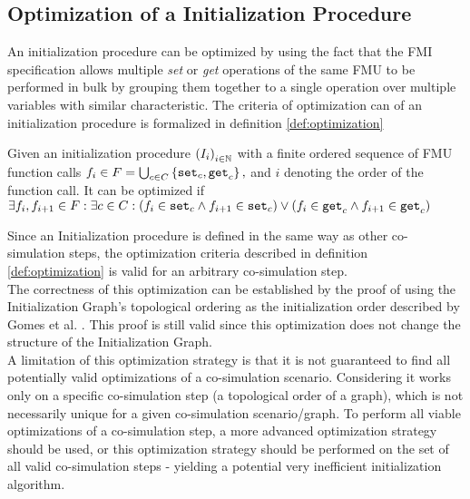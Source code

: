 \subsection{Optimization of a Initialization Procedure}
An initialization procedure can be optimized by using the fact that the FMI specification allows multiple \textit{set} or \textit{get} operations of the same FMU to be performed in bulk by grouping them together to a single operation over multiple variables with similar characteristic. The criteria of optimization can of an initialization procedure is formalized in definition \ref{def:optimization}
\begin{definition}\label{def:optimization}
  Given an initialization procedure $ \left( I_i \right)_{i \in \mathbb{N}}$ with a finite ordered sequence of FMU function calls $f_i \in F = \bigcup_{c \in C}  \left\{ \mathtt{set}_{c},\mathtt{get}_{c} \right\},$ and $i$ denoting the order of the function call. It can be optimized if $\exists f_i, f_{i +1} \in F : \exists c \in C :(f_i \in {\mathtt{set}_{c}} \land f_{i+1} \in {\mathtt{set}_{c}}) \lor (f_i \in {\mathtt{get}_{c}} \land f_{i+1} \in {\mathtt{get}_{c}})$
\end{definition}
Since an Initialization procedure is defined in the same way as other co-simulation steps, the optimization criteria described in definition \ref{def:optimization} is valid for an arbitrary co-simulation step. \\
The correctness of this optimization can be established by the proof of using the Initialization Graph's topological ordering as the initialization order described by Gomes et al. \cite{Gomes2019}. This proof is still valid since this optimization does not change the structure of the Initialization Graph. \\
A limitation of this optimization strategy is that it is not guaranteed to find all potentially valid optimizations of a co-simulation scenario. Considering it works only on a specific co-simulation step (a topological order of a graph), which is not necessarily unique for a given co-simulation scenario/graph. To perform all viable optimizations of a co-simulation step, a more advanced optimization strategy should be used, or this optimization strategy should be performed on the set of all valid co-simulation steps - yielding a potential very inefficient initialization algorithm.
